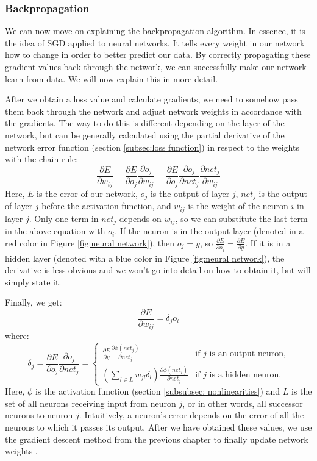 \documentclass[times, utf8, diplomski, english]{fer_eng}
\begin{document}
\subsubsection{Backpropagation}
\label{subsubsec:backpropagation}

We can now move on explaining the backpropagation algorithm. In essence, it is the idea of SGD applied to neural networks. It tells every weight in our network how to change in order to better predict our data. By correctly propagating these gradient values back through the network, we can successfully make our network learn from data. We will now explain this in more detail.

After we obtain a loss value and calculate gradients, we need to somehow pass them back through the network and adjust network weights in accordance with the gradients. The way to do this is different depending on the layer of the network, but can be generally calculated using the partial derivative of the network error function (section \ref{subsec:loss function}) in respect to the weights with the chain rule:
\[ \frac{\partial E}{\partial w_{ij}} = \frac{\partial E}{\partial o_j} \frac{\partial o_j}{\partial w_{ij}} = \frac{\partial E}{\partial o_j} \frac{\partial o_j}{\partial net_j} \frac{\partial net_j}{\partial w_{ij}}\]
Here, $E$ is the error of our network, $o_j$ is the output of layer $j$, $net_j$ is the output of layer $j$ before the activation function, and $w_{ij}$ is the weight of the neuron $i$ in layer $j$. Only one term in $net_j$ depends on $w_{ij}$, so we can substitute the last term in the above equation with $o_i$. If the neuron is in the output layer (denoted in a red color in Figure \ref{fig:neural network}), then $o_j = y$, so $\frac{\partial E}{\partial o_{j}} = \frac{\partial E}{\partial y}$. If it is in a hidden layer (denoted with a blue color in Figure \ref{fig:neural network}), the derivative is less obvious and we won't go into detail on how to obtain it, but will simply state it.

Finally, we get:
\[ \frac{\partial E}{\partial w_{ij}} = \delta_j o_i \]
where:
\[ \delta_j = \frac{\partial E}{\partial o_j} \frac{\partial o_j}{\partial net_j} = \begin{cases}
	\frac{\partial E}{\partial y} \frac{\partial \phi(net_j)}{\partial net_j} & \text{if $j$ is an output neuron,} \\
	(\sum_{l \in L} w_{jl} \delta_l) \frac{\partial \phi(net_j)}{\partial net_j} & \text{if $j$ is a hidden neuron.}
\end{cases}
\]
Here, $\phi$ is the activation function (section \ref{subsubsec: nonlinearities}) and $L$ is the set of all neurons receiving input from neuron $j$, or in other words, all successor neurons to neuron $j$. Intuitively, a neuron's error depends on the error of all the neurons to which it passes its output. After we have obtained these values, we use the gradient descent method from the previous chapter to finally update network weights \cite{Goodfellow-et-al-2016}.
\end{document}
